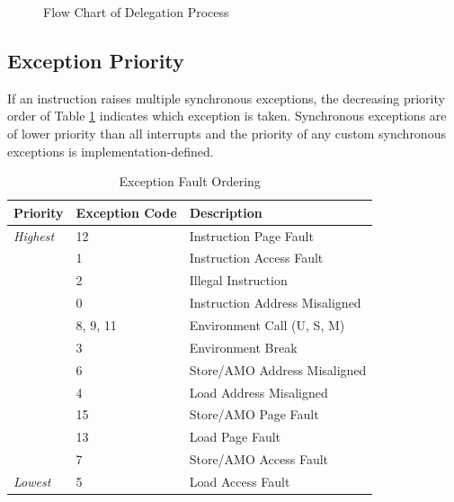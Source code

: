 \documentclass[12pt]{article}
\begin{document}
\begin{figure}[h!]
\centering
{}
\caption{Flow Chart of Delegation Process}
\label{delegation}
\end{figure}

\subsection{Exception Priority}
If an instruction raises multiple synchronous exceptions, the decreasing priority order of Table \ref{exceptionpriorities} indicates which exception is taken. Synchronous exceptions are of lower priority than all interrupts and the priority of any custom synchronous exceptions is implementation-defined. 

\begin{table}[h!]
\centering
\begin{tabular}{| l | l | l |}
\hline
Priority & Exception Code & Description \\
\hline
\emph{Highest} & 12 & Instruction Page Fault \\
\hline
& 1 & Instruction Access Fault \\
\hline
& 2 & Illegal Instruction \\ 
\hline
& 0 & Instruction Address Misaligned \\ 
\hline
& 8, 9, 11 & Environment Call (U, S, M) \\
\hline
& 3 & Environment Break \\ 
\hline
& 6 & Store/AMO Address Misaligned \\ 
\hline
& 4 & Load Address Misaligned \\ 
\hline
& 15 & Store/AMO Page Fault \\
\hline
& 13 & Load Page Fault \\
\hline
& 7 & Store/AMO Access Fault \\
\hline
\emph{Lowest} & 5 & Load Access Fault \\ 
\hline
\end{tabular}
\caption{Exception Fault Ordering}
\label{exceptionpriorities}
\end{table}
\end{document}
